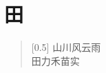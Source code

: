\documentclass[12pt,UTF-8,openany]{ctexbook}
\begin{document}
\hanzibox{}\hanzibox{}\hanzibox{}\hanzibox{}\hspace{1em}\hanzibox{}\hanzibox{}\hanzibox{}\hanzibox{}

\hanzibox{}\hanzibox{}\hanzibox{}\hanzibox{}\hspace{1em}\hanzibox{}\hanzibox{}\hanzibox{}\hanzibox{}

\hanzibox{}\hanzibox{}\hanzibox{}\hanzibox{}\hspace{1em}\hanzibox{}\hanzibox{}\hanzibox{}\hanzibox{}

\hanzibox{}\hanzibox{}\hanzibox{}\hanzibox{}\hspace{1em}\hanzibox{}\hanzibox{}\hanzibox{}\hanzibox{}

\hanzibox{}\hanzibox{}\hanzibox{}\hanzibox{}\hspace{1em}\hanzibox{}\hanzibox{}\hanzibox{}\hanzibox{}

\hanzibox{}\hanzibox{}\hanzibox{}\hanzibox{}\hspace{1em}




\chapter{田}

\begin{large}
    
    \begin{verse}[0.5\linewidth]
        山川风云雨 \\
        田力禾苗实
    \end{verse}
    
\end{large}


\clearpage

\begin{center}
    
    
    
\end{center}


\hanzibox{}\hanzibox{}\hanzibox{}\hanzibox{}\hspace{1em}\hanzibox{}\hanzibox{}\hanzibox{}\hanzibox{}

\hanzibox{}\hanzibox{}\hanzibox{}\hanzibox{}\hspace{1em}\hanzibox{}\hanzibox{}\hanzibox{}\hanzibox{}
\end{document}
